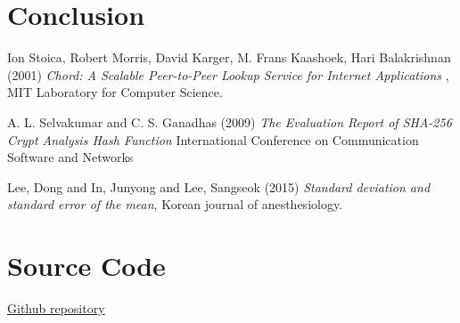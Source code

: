 \documentclass[
    a4paper,
    twocolumn,
]{article}
\begin{document}
\section{Conclusion}

\begin{thebibliography}{9}	
	Ion Stoica, Robert Morris, David Karger, M. Frans Kaashoek, Hari Balakrishnan (2001) \emph{Chord: A Scalable Peer-to-Peer Lookup Service for Internet Applications }, MIT Laboratory for Computer Science.
	
	A. L. Selvakumar and C. S. Ganadhas (2009) \emph{The Evaluation Report of SHA-256 Crypt Analysis Hash Function} International Conference on Communication Software and Networks
	
	Lee, Dong and In, Junyong and Lee, Sangseok (2015) \emph{Standard deviation and standard error of the mean}, Korean journal of anesthesiology.
\end{thebibliography}

\appendix
\section{Source Code}
\href{https://github.com/YasiruR/dht/tree/master}{Github repository}
\end{document}
